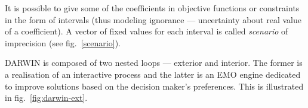 It is possible to give some of the coefficients in objective functions or
constraints in the form of intervals (thus modeling ignorance --- uncertainty
about real value of a coefficient). A vector of fixed values for each interval
is called \textit{scenario} of imprecision (see fig.~\ref{scenario}).

DARWIN is composed of two nested loops --- exterior and interior. The former
is a realisation of an interactive process and the latter is an EMO engine
dedicated to improve solutions based on the decision maker's preferences. This
is illustrated in fig.~\ref{fig:darwin-ext}.

\begin{figure} 
  \begin{center}
\end{center}
\end{figure}
